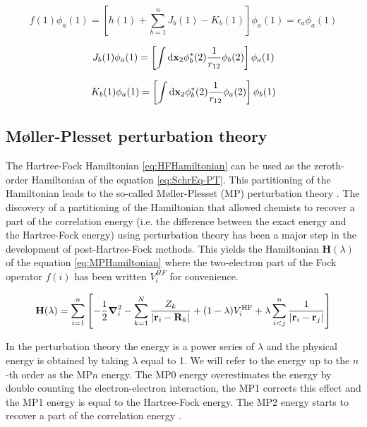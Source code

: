 \documentclass[11pt,a4paper]{article}
\newcommand{\bH}{\mathbf{H}}
\begin{document}
\begin{equation}\label{eq:FockOp}
f(1)\phi_a(1) = \left[h(1) + \sum\limits_{b=1}^{n} J_b(1) - K_b(1)\right]\phi_a(1)=\epsilon_a\phi_a(1)
\end{equation}

\begin{equation}\label{eq:CoulOp}
J_b(1)\phi_a(1)=\left[\int\dd\vb{x}_2\phi_b^*(2)\frac{1}{r_{12}}\phi_b(2) \right]\phi_a(1)
\end{equation}

\begin{equation}\label{eq:ExcOp}
K_b(1)\phi_a(1)=\left[\int\dd\vb{x}_2\phi_b^*(2)\frac{1}{r_{12}}\phi_a(2) \right]\phi_b(1)
\end{equation}


\subsection{M{\o}ller-Plesset perturbation theory}

The Hartree-Fock Hamiltonian \eqref{eq:HFHamiltonian} can be used as the zeroth-order Hamiltonian of the equation \eqref{eq:SchrEq-PT}. This partitioning of the Hamiltonian leads to the so-called M{\o}ller-Plesset (MP) perturbation theory \cite{Moller_1934}. The discovery of a partitioning of the Hamiltonian that allowed chemists to recover a part of the correlation energy (i.e. the difference between the exact energy and the Hartree-Fock energy) using perturbation theory has been a major step in the development of post-Hartree-Fock methods. This yields the Hamiltonian $\bH(\lambda)$ of the equation \eqref{eq:MPHamiltonian} where the two-electron part of the Fock operator $f(i)$ has been written $V_i^{HF}$ for convenience.

\begin{equation}\label{eq:MPHamiltonian}
    \bH(\lambda)=\sum\limits_{i=1}^{n}\left[-\frac{1}{2}\grad_i^2 - \sum\limits_{k=1}^{N} \frac{Z_k}{|\vb{r}_i-\vb{R}_k|} + (1-\lambda)V_i^{\text{HF}}+\lambda\sum\limits_{i<j}^{n}\frac{1}{|\vb{r}_i-\vb{r}_j|} \right]
\end{equation}

In the perturbation theory the energy is a power series of $\lambda$ and the physical energy is obtained by taking $\lambda$ equal to 1. We will refer to the energy up to the $n$-th order as the MP$n$ energy. The MP0 energy overestimates the energy by double counting the electron-electron interaction, the MP1 corrects this effect and the MP1 energy is equal to the Hartree-Fock energy. The MP2 energy starts to recover a part of the correlation energy \cite{SzaboBook}.
\end{document}
